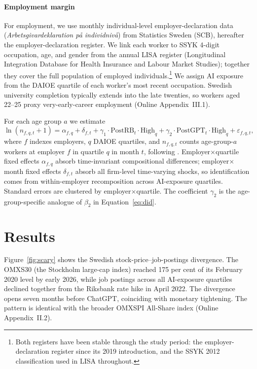 \documentclass[preprint,12pt,authoryear]{elsarticle}
\begin{document}
\paragraph{Employment margin} {\sloppy For employment, we use monthly individual-level employer-declaration data (\emph{Arbetsgivardeklaration på individnivå}) from Statistics Sweden (SCB), hereafter the employer-declaration register. We link each worker to SSYK 4-digit occupation, age, and gender from the annual LISA register (Longitudinal Integration Database for Health Insurance and Labour Market Studies); together they cover the full population of employed individuals.\footnote{Both registers have been stable through the study period: the employer-declaration register since its 2019 introduction, and the SSYK 2012 classification used in LISA throughout.} We assign AI exposure from the DAIOE quartile of each worker's most recent occupation. Swedish university completion typically extends into the late twenties, so workers aged 22--25 proxy very-early-career employment (Online Appendix~III.1).\par}

For each age group $a$ we estimate
\begin{equation}\label{eq:emp_did}
\ln(n_{f,q,t}+1) = \alpha_{f,q} + \delta_{f,t} + \gamma_1 \cdot \text{PostRB}_t \cdot \text{High}_q + \gamma_2 \cdot \text{PostGPT}_t \cdot \text{High}_q + \varepsilon_{f,q,t},
\end{equation}
where $f$ indexes employers, $q$ DAIOE quartiles, and $n_{f,q,t}$ counts age-group-$a$ workers at employer $f$ in quartile $q$ in month $t$, following \citet{brynjolfsson2025canaries}. Employer$\times$quartile fixed effects $\alpha_{f,q}$ absorb time-invariant compositional differences; employer$\times$month fixed effects $\delta_{f,t}$ absorb all firm-level time-varying shocks, so identification comes from within-employer recomposition across AI-exposure quartiles. Standard errors are clustered by employer$\times$quartile. The coefficient $\gamma_2$ is the age-group-specific analogue of $\beta_2$ in Equation~\eqref{eq:did}.


\section{Results}\label{sec:results}
Figure~\ref{fig:scary} shows the Swedish stock-price--job-postings divergence. The OMXS30 (the Stockholm large-cap index) reached 175 per cent of its February 2020 level by early 2026, while job postings across all AI-exposure quartiles declined together from the Riksbank rate hike in April 2022. The divergence opens seven months before ChatGPT, coinciding with monetary tightening. The pattern is identical with the broader OMXSPI All-Share index (Online Appendix~II.2).
\end{document}
